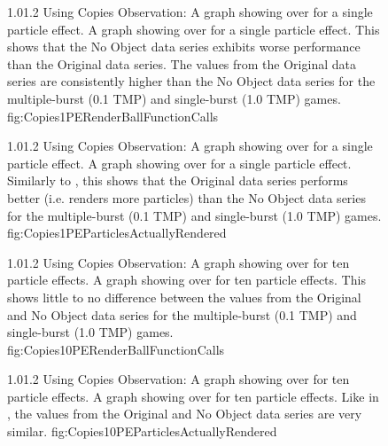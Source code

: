 \begin{figure}
\addtocounter{figure}{-1}

	\vspace{-1.5cm}
	{1.0}{1.2}
	{Using Copies Observation: A graph showing  over  for a single particle effect.}
	{A graph showing  over  for a single particle effect. This shows that the No Object data series exhibits worse performance than the Original data series. The  values from the Original data series are consistently higher than the No Object data series for the multiple-burst (0.1 TMP) and single-burst (1.0 TMP) games.}
	{fig:Copies1PERenderBallFunctionCalls}

	{1.0}{1.2}
	{Using Copies Observation: A graph showing  over  for a single particle effect.}
	{A graph showing  over  for a single particle effect. Similarly to , this shows that the Original data series performs better (i.e. renders more particles) than the No Object data series for the multiple-burst (0.1 TMP) and single-burst (1.0 TMP) games.}
	{fig:Copies1PEParticlesActuallyRendered}

\end{figure}

\begin{figure}
\addtocounter{figure}{-1}

	\vspace{-1.5cm}
	{1.0}{1.2}
	{Using Copies Observation: A graph showing  over  for ten particle effects.}
	{A graph showing  over  for ten particle effects. This shows little to no difference between the  values from the Original and No Object data series for the multiple-burst (0.1 TMP) and single-burst (1.0 TMP) games.}
	{fig:Copies10PERenderBallFunctionCalls}

	{1.0}{1.2}
	{Using Copies Observation: A graph showing  over  for ten particle effects.}
	{A graph showing  over  for ten particle effects. Like in , the  values from the Original and No Object data series are very similar. }
	{fig:Copies10PEParticlesActuallyRendered}

\end{figure}


